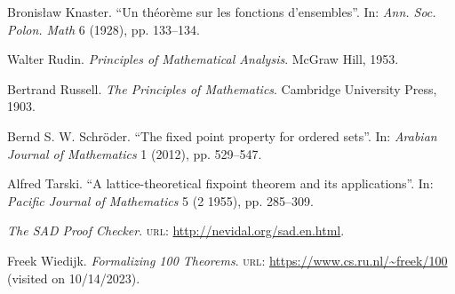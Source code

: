 \documentclass{article}
\begin{document}
\begin{thebibliography}{9}
  Bronis\l aw Knaster.
  ``Un théorème sur les fonctions d'ensembles''.
  In: \textit{Ann. Soc. Polon. Math} 6 (1928),
  pp. 133--134.

  Walter Rudin.
  \textit{Principles of Mathematical Analysis}.
  McGraw Hill, 1953.

  Bertrand Russell.
  \textit{The Principles of Mathematics}.
  Cambridge University Press, 1903.

  Bernd S. W. Schröder.
  ``The fixed point property for ordered sets''.
  In: \textit{Arabian Journal of Mathematics} 1 (2012),
  pp. 529--547.

  Alfred Tarski.
  ``A lattice-theoretical fixpoint theorem and its applications''.
  In: \textit{Pacific Journal of Mathematics} 5 (2 1955),
  pp. 285--309.

  \textit{The SAD Proof Checker}.
  \textsc{url}: \url{http://nevidal.org/sad.en.html}.

  Freek Wiedijk.
  \textit{Formalizing 100 Theorems}.
  \textsc{url}: \url{https://www.cs.ru.nl/~freek/100}
  (visited on 10/14/2023).
\end{thebibliography}
\end{document}
